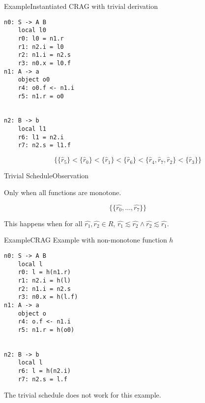 \begin{frame}[fragile=singleslide]{Example}{Instantiated CRAG with trivial derivation}

\begin{multicols}{3}
\begin{Verbatim}[fontsize=\small]
n0: S -> A B
    local l0
    r0: l0 = n1.r
    r1: n2.i = l0
    r2: n1.i = n2.s
    r3: n0.x = l0.f
n1: A -> a
    object o0
    r4: o0.f <- n1.i
    r5: n1.r = o0


n2: B -> b
    local l1
    r6: l1 = n2.i
    r7: n2.s = l1.f
\end{Verbatim}
\end{multicols}

\[
     \Big \{ \{ \hat{r}_5 \} < \{ \hat{r}_0 \} < \{ \hat{r}_1 \} < \{ \hat{r}_6 \} < \{ \hat{r}_4 , \hat{r}_7, \hat{r}_2 \} < \{ \hat{r}_3 \}  \Big \}
\]

\end{frame}



\begin{frame}{Trivial Schedule}{Observation}

Only when \alert{all functions are monotone}. 

$$ \Big\{ \{ \hat{r_0}, \dots, \hat{r_7} \} \Big \}$$

This happens when for all $\hat{r_1}, \hat{r_2} \in \hat{R}$, $\hat{r_1} \lesssim \hat{r_2} \wedge \hat{r_2} \lesssim \hat{r_1}$.

\end{frame}




\begin{frame}[fragile=singleslide]{Example}{CRAG Example with non-monotone function $h$}

\begin{multicols}{3}
\begin{Verbatim}[fontsize=\small]
n0: S -> A B
    local l
    r0: l = h(n1.r)
    r1: n2.i = h(l)
    r2: n1.i = n2.s
    r3: n0.x = h(l.f)
n1: A -> a
    object o
    r4: o.f <- n1.i
    r5: n1.r = h(o0)


n2: B -> b
    local l
    r6: l = h(n2.i)
    r7: n2.s = l.f
\end{Verbatim}
\end{multicols}

\newlinevspace

The trivial schedule \alert{does not work} for this example.

\end{frame}

